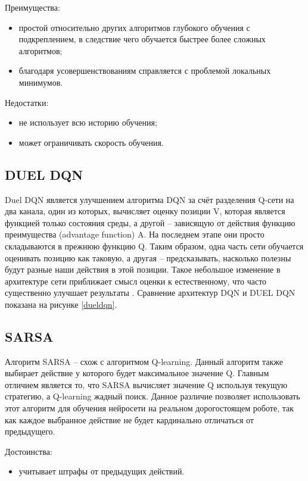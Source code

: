 Преимущества:
\begin{itemize}
	\item простой относительно других алгоритмов глубокого обучения с подкреплением, в следствие чего обучается быстрее более сложных алгоритмов;
	\item благодаря усовершенствованиям справляется с проблемой локальных минимумов.
\end{itemize}

Недостатки:
\begin{itemize}
	\item не использует всю историю обучения;
	\item может ограничивать скорость обучения.
\end{itemize}


\subsection{DUEL DQN}
Duel DQN является улучшением алгоритма DQN за счёт разделения Q-сети на два канала, один из которых, вычисляет оценку позиции V, которая является функцией только состояния среды, а другой -- зависящую от действия функцию преимущества (advantage function) A. 
На последнем этапе они просто складываются в прежнюю функцию Q. 
Таким образом, одна часть сети обучается оценивать позицию как таковую, а другая -- предсказывать, насколько полезны будут разные наши действия в этой позиции. 
Такое небольшое изменение в архитектуре сети приближает смысл оценки к естественному, что часто существенно улучшает результаты \cite{DUEL_DQN}.
Сравнение архитектур DQN и DUEL DQN показана на рисунке \ref{dueldqn}.


\subsection{SARSA}

Алгоритм SARSA – схож с алгоритмом Q-learning. 
Данный алгоритм также выбирает действие у которого будет максимальное значение Q. 
Главным отличием является то, что SARSA вычисляет значение Q используя текущую стратегию, а Q-learning жадный поиск. 
Данное различие позволяет использовать этот алгоритм для обучения нейросети на реальном дорогостоящем роботе, так как каждое выбранное действие не будет кардинально отличаться от предыдущего.

Достоинства:
\begin{itemize}
	\item учитывает штрафы от предыдущих действий.
\end{itemize}

